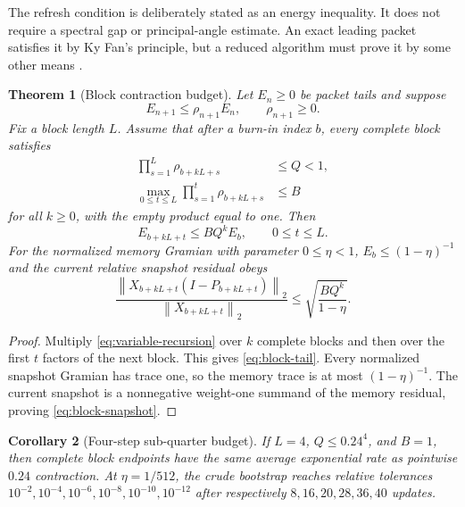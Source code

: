 \documentclass[11pt]{article}
\newtheorem{theorem}{Theorem}[section]
\newtheorem{corollary}[theorem]{Corollary}
\theoremstyle{definition}
\theoremstyle{remark}
\newcommand{\norm}[1]{\left\lVert#1\right\rVert}
\begin{document}
The refresh condition is deliberately stated as an energy inequality.  It
does not require a spectral gap or principal-angle estimate.  An exact
leading packet satisfies it by Ky Fan's principle, but a reduced algorithm
must prove it by some other means \citep{Parlett1998,GolubVanLoan2013}.

\begin{theorem}[Block contraction budget]
\label{thm:block}
Let $E_n\ge0$ be packet tails and suppose
\begin{equation}
 E_{n+1}\le\rho_{n+1}E_n,
 \qquad \rho_{n+1}\ge0.
 \label{eq:variable-recursion}
\end{equation}
Fix a block length $L$.  Assume that after a burn-in index $b$, every complete
block satisfies
\begin{align}
 \prod_{s=1}^L\rho_{b+kL+s}&\le Q<1,
 \label{eq:block-product}\\
 \max_{0\le t\le L}\prod_{s=1}^t\rho_{b+kL+s}&\le B
 \label{eq:prefix-product}
\end{align}
for all $k\ge0$, with the empty product equal to one.  Then
\begin{equation}
 E_{b+kL+t}\le BQ^kE_b,
 \qquad 0\le t\le L.
 \label{eq:block-tail}
\end{equation}
For the normalized memory Gramian with parameter $0\le\eta<1$,
$E_b\le(1-\eta)^{-1}$ and the current relative snapshot residual obeys
\begin{equation}
 \frac{\norm{X_{b+kL+t}(I-P_{b+kL+t})}_2}
 {\norm{X_{b+kL+t}}_2}
 \le \sqrt{\frac{BQ^k}{1-\eta}}.
 \label{eq:block-snapshot}
\end{equation}
\end{theorem}

\begin{proof}
Multiply \eqref{eq:variable-recursion} over $k$ complete blocks and then over
the first $t$ factors of the next block.  This gives
\eqref{eq:block-tail}.  Every normalized snapshot Gramian has trace one, so
the memory trace is at most $(1-\eta)^{-1}$.  The current snapshot is a
nonnegative weight-one summand of the memory residual, proving
\eqref{eq:block-snapshot}.
\end{proof}

\begin{corollary}[Four-step sub-quarter budget]
\label{cor:four-step}
If $L=4$, $Q\le0.24^4$, and $B=1$, then complete block endpoints have the same
average exponential rate as pointwise $0.24$ contraction.  At
$\eta=1/512$, the crude bootstrap reaches relative tolerances
$10^{-2},10^{-4},10^{-6},10^{-8},10^{-10},10^{-12}$ after respectively
$8,16,20,28,36,40$ updates.
\end{corollary}
\end{document}
